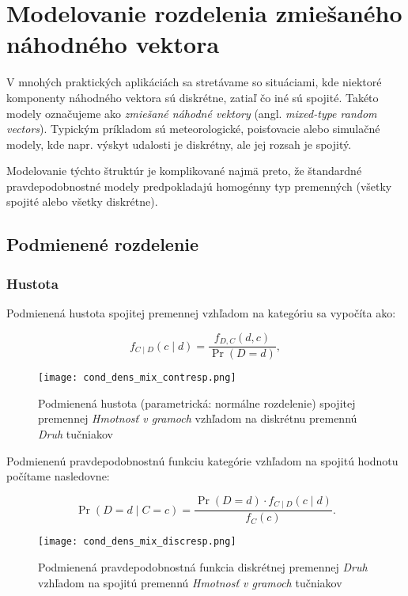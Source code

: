 \section{Modelovanie rozdelenia zmiešaného náhodného vektora}\label{sec:joint_mixture_modeling}

V mnohých praktických aplikáciách sa stretávame so situáciami, kde niektoré komponenty náhodného vektora sú diskrétne, zatiaľ čo iné sú spojité. Takéto modely označujeme ako \textit{zmiešané náhodné vektory} (angl. \textit{mixed-type random vectors}). Typickým príkladom sú meteorologické, poisťovacie alebo simulačné modely, kde napr. výskyt udalosti je diskrétny, ale jej rozsah je spojitý. 

Modelovanie týchto štruktúr je komplikované najmä preto, že štandardné pravdepodobnostné modely predpokladajú homogénny typ premenných (všetky spojité alebo všetky diskrétne).

\subsection{Podmienené rozdelenie}

\subsubsection{Hustota}

Podmienená hustota spojitej premennej vzhľadom na kategóriu sa vypočíta ako:

\begin{equation}
f_{C \mid D}(c \mid d) = \frac{f_{D,C}(d, c)}{\Pr(D = d)},
\end{equation}

\begin{figure}[H]
    \centering
    \texttt{[image: cond\_dens\_mix\_contresp.png]}
    \caption{Podmienená hustota (parametrická: normálne rozdelenie) spojitej premennej \textit{Hmotnosť v gramoch} vzhľadom na diskrétnu premennú \textit{Druh} tučniakov}
    \label{fig:cond_dens_mix_contresp}
\end{figure}

Podmienenú pravdepodobnostnú funkciu kategórie vzhľadom na spojitú hodnotu počítame nasledovne:

\begin{equation}
\Pr(D = d \mid C = c) = \frac{\Pr(D = d) \cdot f_{C \mid D}(c \mid d)}{f_C(c)}.
\end{equation}

\begin{figure}[H]
    \centering
    \texttt{[image: cond\_dens\_mix\_discresp.png]}
    \caption{Podmienená pravdepodobnostná funkcia diskrétnej premennej \textit{Druh} vzhľadom na spojitú premennú \textit{Hmotnosť v gramoch} tučniakov}
    \label{fig:cond_dens_mix_contresp}
\end{figure}

